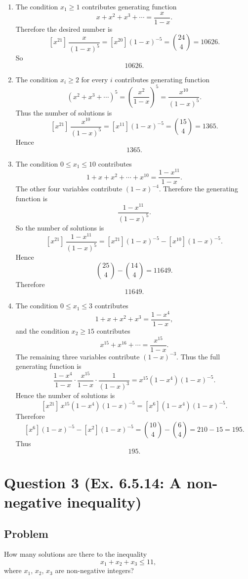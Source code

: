 \documentclass[12pt]{article}
\begin{document}
\begin{enumerate}[label=(\alph*)]
\item The condition $x_1\ge 1$ contributes generating function
\[
x+x^2+x^3+\cdots = \frac{x}{1-x}.
\]
Therefore the desired number is
\[
[x^{21}]\,\frac{x}{(1-x)^5}=[x^{20}](1-x)^{-5}=\binom{24}{4}=10626.
\]
So
\[
\boxed{10626}.
\]

\item The condition $x_i\ge 2$ for every $i$ contributes generating function
\[
\left(x^2+x^3+\cdots\right)^5=\left(\frac{x^2}{1-x}\right)^5=\frac{x^{10}}{(1-x)^5}.
\]
Thus the number of solutions is
\[
[x^{21}]\,\frac{x^{10}}{(1-x)^5}=[x^{11}](1-x)^{-5}=\binom{15}{4}=1365.
\]
Hence
\[
\boxed{1365}.
\]

\item The condition $0\le x_1\le 10$ contributes
\[
1+x+x^2+\cdots +x^{10}=\frac{1-x^{11}}{1-x}.
\]
The other four variables contribute $(1-x)^{-4}$. Therefore the generating function is
\[
\frac{1-x^{11}}{(1-x)^5}.
\]
So the number of solutions is
\[
[x^{21}]\,\frac{1-x^{11}}{(1-x)^5}
=[x^{21}](1-x)^{-5}-[x^{10}](1-x)^{-5}.
\]
Hence
\[
\binom{25}{4}-\binom{14}{4}=11649.
\]
Therefore
\[
\boxed{11649}.
\]

\item The condition $0\le x_1\le 3$ contributes
\[
1+x+x^2+x^3=\frac{1-x^4}{1-x},
\]
and the condition $x_2\ge 15$ contributes
\[
x^{15}+x^{16}+\cdots = \frac{x^{15}}{1-x}.
\]
The remaining three variables contribute $(1-x)^{-3}$. Thus the full generating function is
\[
\frac{1-x^4}{1-x}\cdot \frac{x^{15}}{1-x}\cdot \frac{1}{(1-x)^3}
= x^{15}(1-x^4)(1-x)^{-5}.
\]
Hence the number of solutions is
\[
[x^{21}]\,x^{15}(1-x^4)(1-x)^{-5}
=[x^6](1-x^4)(1-x)^{-5}.
\]
Therefore
\[
[x^6](1-x)^{-5}-[x^2](1-x)^{-5}
=\binom{10}{4}-\binom{6}{4}=210-15=195.
\]
Thus
\[
\boxed{195}.
\]
\end{enumerate}

\newpage

\section{Question 3 (Ex. 6.5.14: A non-negative inequality)}
\subsection{Problem}
How many solutions are there to the inequality
\[
x_1+x_2+x_3\le 11,
\]
where $x_1$, $x_2$, $x_3$ are non-negative integers?
\end{document}
